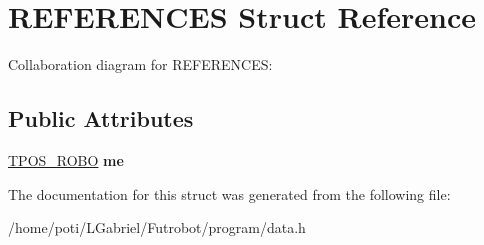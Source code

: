 \hypertarget{structREFERENCES}{}\section{R\+E\+F\+E\+R\+E\+N\+C\+ES Struct Reference}
\label{structREFERENCES}


Collaboration diagram for R\+E\+F\+E\+R\+E\+N\+C\+ES\+:
\subsection*{Public Attributes}
\begin{DoxyCompactItemize}
\item 
\hyperlink{structTPOS__ROBO}{T\+P\+O\+S\+\_\+\+R\+O\+BO} {\bfseries me}\hypertarget{structREFERENCES_a3378df52e22b1aee2bc4afca36031bfa}{}\label{structREFERENCES_a3378df52e22b1aee2bc4afca36031bfa}

\end{DoxyCompactItemize}


The documentation for this struct was generated from the following file\+:\begin{DoxyCompactItemize}
\item 
/home/poti/\+L\+Gabriel/\+Futrobot/program/data.\+h\end{DoxyCompactItemize}
